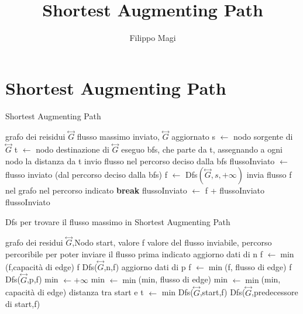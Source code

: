 \documentclass{article}
\title{Shortest Augmenting Path}
\author{Filippo Magi }
\begin{document}
\maketitle

\section{Shortest Augmenting Path}
\begin{algorithm}
\caption{Shortest Augmenting Path}
\begin{algorithmic}
\REQUIRE grafo dei reisidui $\overset{\leftrightarrow}{G}$
\ENSURE flusso massimo inviato, $\overset{\leftrightarrow}{G}$ aggiornato
\STATE s $\leftarrow$ nodo sorgente di $\overset{\leftrightarrow}{G}$
\STATE t $\leftarrow$ nodo destinazione di $\overset{\leftrightarrow}{G}$
\STATE eseguo bfs, che parte da t, assegnando a ogni nodo la distanza da t 
\STATE invio flusso nel percorso deciso dalla bfs
\STATE flussoInviato $\leftarrow$ flusso inviato (dal percorso deciso dalla bfs)
\STATE f $\leftarrow$ Dfs$(\overset{\leftrightarrow}{G}, s, +\infty)$
\STATE invia flusso f nel grafo nel percorso indicato
\ELSE
\STATE \textbf{break}
\ENDIF
\STATE flussoInviato $\leftarrow$ f + flussoInviato 
\ENDWHILE
\RETURN flussoInviato
\end{algorithmic}
\end{algorithm}
\begin{algorithm}
\caption{Dfs per trovare il flusso massimo in Shortest Augmenting Path}
\begin{algorithmic}
\REQUIRE grafo dei residui  $\overset{\leftrightarrow}{G}$,Nodo start, valore f
\ENSURE valore del flusso inviabile, percorso percoribile per poter inviare il flusso prima indicato
\STATE aggiorno dati di n
\STATE f $\leftarrow \min$(f,capacità di edge)
\RETURN f
\ENDIF
\RETURN Dfs($\overset{\leftrightarrow}{G}$,n,f)
\STATE aggiorno dati di p
\STATE f $\leftarrow \min$(f, flusso di edge)
\RETURN f
\ENDIF
\RETURN Dfs($\overset{\leftrightarrow}{G}$,p,f)
\ENDIF
\ENDFOR
\STATE min $\leftarrow +\infty$
\STATE min $\leftarrow \min$(min, flusso di edge)
\ENDIF
\ENDFOR
{}
\STATE min $\leftarrow \min$(min, capacità di edge)
\ENDIF
\ENDFOR
\STATE distanza tra start e t $\leftarrow$ min
\RETURN Dfs($\overset{\leftrightarrow}{G}$,start,f)
\ELSE
\RETURN Dfs($\overset{\leftrightarrow}{G}$,predecessore di start,f)
\ENDIF
\ENDIF
{}
\end{algorithmic}
\end{algorithm}
\end{document}
